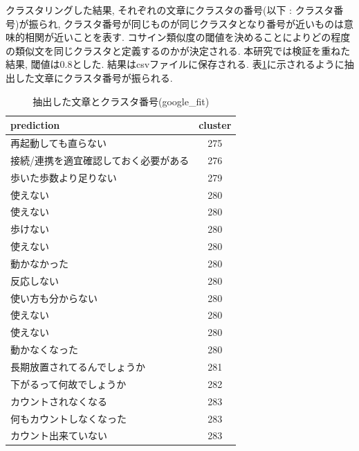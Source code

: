 クラスタリングした結果, それぞれの文章にクラスタの番号(以下 : クラスタ番号)が振られ, クラスタ番号が同じものが同じクラスタとなり番号が近いものは意味的相関が近いことを表す. コサイン類似度の閾値を決めることによりどの程度の類似文を同じクラスタと定義するのかが決定される. 本研究では検証を重ねた結果, 閾値は0.8とした. 
結果はcsvファイルに保存される. 表\ref{tb:clustering}に示されるように抽出した文章にクラスタ番号が振られる. 

\begin{table}[H]
  \caption{抽出した文章とクラスタ番号(google\_fit)}
  \label{tb:clustering}
  \begin{center}
  \begin{tabularx}{\linewidth}{|X|c|}
    \hline
    prediction&cluster\\\hline\hline
    再起動しても直らない&275\\\hline
    接続/連携を適宜確認しておく必要がある&276\\\hline
    歩いた歩数より足りない&279\\\hline
    使えない&280\\\hline
    使えない&280\\\hline
    歩けない&280\\\hline
    使えない&280\\\hline
    動かなかった&280\\\hline
    反応しない&280\\\hline
    使い方も分からない&280\\\hline
    使えない&280\\\hline
    使えない&280\\\hline
    動かなくなった&280\\\hline
    長期放置されてるんでしょうか&281\\\hline
    下がるって何故でしょうか&282\\\hline
    カウントされなくなる&283\\\hline
    何もカウントしなくなった&283\\\hline
    カウント出来ていない&283\\\hline
  \end{tabularx}\end{center}
\end{table}

